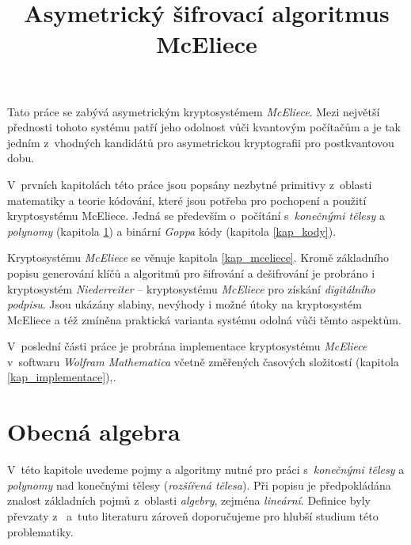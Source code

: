 \documentclass[thesis=M,czech,hidelinks]{FITthesis}[2012/06/26]
\title{Asymetrický šifrovací algoritmus McEliece}
\newcommand{\0}{{\textcolor[gray]{0.75}{0}}}
\begin{document}

\begin{introduction}


Tato práce se zabývá asymetrickým kryptosystémem \emph{McEliece}. Mezi největší
přednosti tohoto systému patří jeho odolnost vůči kvantovým počítačům a je tak
jedním z~vhodných kandidátů pro asymetrickou kryptografii pro postkvantovou
dobu.

V~prvních kapitolách této práce jsou popsány nezbytné primitivy z~oblasti
matematiky a teorie kódování, které jsou potřeba pro pochopení a použití
kryptosystému McEliece. Jedná se především o~počítání s~\emph{konečnými tělesy}
a \emph{polynomy} (kapitola \ref{kap_telesa}) a binární \emph{Goppa} kódy
(kapitola \ref{kap_kody}).

Kryptosystému \emph{McEliece} se věnuje kapitola \ref{kap_mceliece}. Kromě
základního popisu generování klíčů a algoritmů pro šifrování a dešifrování je
probráno i kryptosystém \emph{Niederreiter} --  kryptosystému
\emph{McEliece} pro získání \emph{digitálního podpisu}. Jsou ukázány slabiny,
nevýhody i možné útoky na kryptosystém McEliece a též zmíněna praktická varianta
systému odolná vůči těmto aspektům.

V~poslední části  práce je probrána implementace kryptosystému \emph{McEliece}
v~softwaru \emph{Wolfram Mathematica} včetně změřených časových
složitostí (kapitola \ref{kap_implementace}),.

\end{introduction}





\chapter{Obecná algebra}\label{kap_telesa}

V~této kapitole uvedeme pojmy a algoritmy nutné pro práci s~\emph{konečnými
tělesy} a \emph{polynomy} nad konečnými tělesy (\emph{rozšířená tělesa}). Při
popisu je předpokládána znalost základních pojmů z~oblasti \emph{algebry},
zejména \emph{lineární}. Definice byly převzaty z~\cite{Paar,Mares,Pytlicek}
a~tuto literaturu zároveň doporučujeme pro hlubší studium této problematiky.
\end{document}
